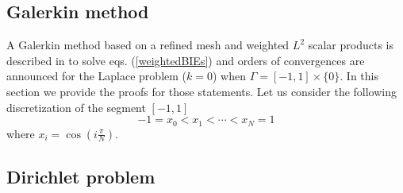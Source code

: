 \documentclass[a4paper]{article}
\begin{document}
\subsection{Galerkin method}

\label{subsec:GalerkineSetting}
A Galerkin method based on a refined mesh and weighted $L^2$ scalar products is described in \cite{alouges2018new} to solve eqs. (\ref{weightedBIEs}) and orders of convergences are announced for the Laplace problem ($k = 0$) when $\Gamma = [-1,1] \times\{0\}$. In this section we provide the proofs for those statements. 
Let us consider the following discretization of the segment $[-1,1]$
\[-1 = x_0 < x_1 < \cdots < x_N = 1\]
where $x_i = \cos(i \frac{\pi}{N})$.  

\subsection{Dirichlet problem}
\end{document}
